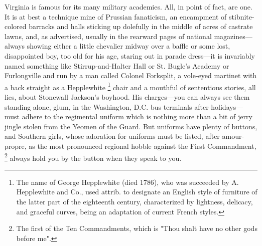   Virginia is famous for its many military academies. All, in point of fact, are
one. It is at best a technique mine of Prussian fanaticism, an encampment of
stibnite-colored 
barracks and halls sticking up dolefully 
in the middle of acres of castrate 
lawns, and, as advertised, usually in the rearward pages of national
magazines---always showing either a little chevalier midway over a baffle or some
lost, disappointed boy, too old for his age, staring out in parade dress---it is
invariably named something like Stirrup-and-Halter Hall or St. Bugle's Academy
or Furlongville and run by a man called Colonel Forksplit, a vole-eyed martinet
with a back straight as a Hepplewhite 
\footnote{ The name of George Hepplewhite (died 1786), who was succeeded by A.
Hepplewhite and Co., used attrib. to designate an English style of furniture of
the latter part of the eighteenth century, characterized by lightness, delicacy,
and graceful curves, being an adaptation of current French styles. 
}
chair and a mouthful of sententious
stories, all lies, about Stonewall Jackson's boyhood. His charges---you can 
always see them standing alone, glum, 
in the Washington, D.C. bus terminals after holidays---must adhere to the 
regimental uniform which is nothing more than a bit of jerry jingle 
stolen from the Yeomen 
of the Guard. But uniforms have plenty of
buttons, and Southern girls, whose adoration for uniforms must be listed, after
amour-propre, 
as the most pronounced regional hobble 
against the First Commandment, 
\footnote{The first of the Ten Commandments, which is "Thou shalt have no other
  gods before me".}
always hold you by the button when they speak to you.


